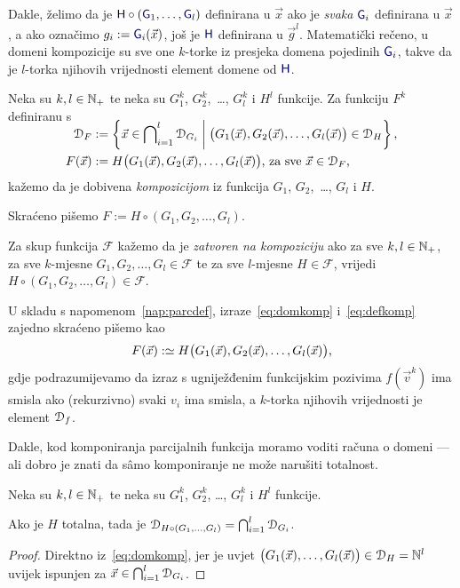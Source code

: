 Dakle, želimo da je $\f H\circ(\f G_1,\dotsc,\f G_l)$ definirana u $\vec x$ ako je \emph{svaka} $\f G_i$ definirana u $\vec x$, a ako označimo $g_i:=\f G_i(\vec x)$, još je $\f H$ definirana u $\vec g^{l}$. Matematički rečeno, u domeni kompozicije su sve one $k$-torke iz presjeka domena pojedinih $\f G_i$, takve da je $l$-torka njihovih vrijednosti element domene od $\f H$.
\begin{definicija}[{name=[kompozicija]}]
Neka su $k,l\in{\mathbb N}_+$ te neka su $G_1^k$, $G_2^k$,~\ldots, $G_l^k$ i $H^l$ funkcije. Za funkciju $F^k$ definiranu s
\begin{align}
\SwapAboveDisplaySkip
\label{eq:domkomp}
    \dom{F}&:=\left\{\vec x\in\bigcap\nolimits_{i=1}^l\dom{G_i}\;\middle|\;\bigl(G_1(\vec x),G_2(\vec x),\dotsc,G_l(\vec x)\bigr)\in\dom{H}\right\}\text,\\
\label{eq:defkomp}
    F(\vec x)&:=H\bigl(G_1(\vec x),G_2(\vec x),\dotsc,G_l(\vec x)\bigr)\text{, za sve $\vec x\in\dom F$,}
\end{align}
kažemo da je dobivena \emph{kompozicijom} iz funkcija $G_1$, $G_2$,~\ldots, $G_l$ i $H$.

	Skraćeno pišemo $F:=H\circ(G_1,G_2,\dotsc,G_l)$. %

Za skup funkcija $\mathcal F$ kažemo da je \emph{zatvoren na kompoziciju} ako za sve $k,l\in{\mathbb N}_+$, za sve $k$-mjesne $G_1,G_2,\dotsc,G_l\in\mathcal F$ te za sve $l$-mjesne $H\in\mathcal F$, vrijedi $H\circ(G_1,G_2,\dotsc,G_l)\in\mathcal F$.
\end{definicija}
U skladu s napomenom~\ref{nap:parcdef}, izraze~\eqref{eq:domkomp} i~\eqref{eq:defkomp} zajedno skraćeno pišemo kao
\begin{equation}
    F(\vec x):\simeq H\bigl(G_1(\vec x),G_2(\vec x),\dotsc,G_l(\vec x)\bigr)\text,
\end{equation}
gdje podrazumijevamo da izraz s ugniježđenim funkcijskim pozivima $f(\vec v^{k})$ ima smisla ako (rekurzivno) svaki $v_i$ ima smisla, a $k$-torka njihovih vrijednosti je element $\mathcal D_{f}$.

Dakle, kod komponiranja parcijalnih funkcija moramo voditi računa o domeni --- ali dobro je znati da sâmo komponiranje ne može narušiti totalnost.

\begin{lema}[{name=[domena kompozicije slijeva s totalnom funkcijom]}]\label{lm:comptot}
    Neka su $k,l\in{\mathbb N}_+$ te neka su $G_1^k$, $G_2^k$, \ldots, $G_l^k$ i $H^l$ funkcije.
    
    Ako je $H$ totalna, tada je $\mathcal D_{H\circ(G_1,\dotsc,G_l)}=\bigcap_{i=1}^l\mathcal D_{G_i}$.
\end{lema}
\begin{proof}
    Direktno iz~\eqref{eq:domkomp}, jer je uvjet $\bigl(G_1(\vec x),\dotsc,G_l(\vec x)\bigr)\in\mathcal D_{H}={\mathbb N}^l$ uvijek ispunjen za $\vec x\in\bigcap_{i=1}^l\mathcal D_{G_i}$.
\end{proof}

